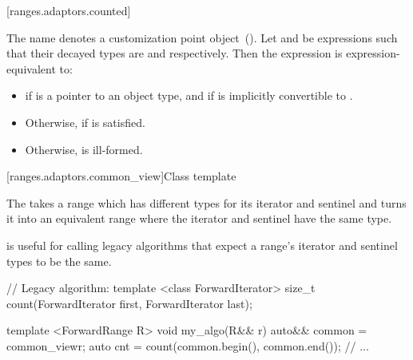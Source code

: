 [ranges.adaptors.counted]{}

\pnum
The name  denotes a customization point object~().
Let  and  be expressions such that their decayed types are 
and  respectively. Then the expression  is
expression-equivalent to:

\begin{itemize}
\item {} if
 is a pointer to an object type, and if  is implicitly
convertible to .
\item Otherwise, 
if  is satisfied.
\item Otherwise,  is ill-formed.
\end{itemize}

[ranges.adaptors.common_view]{Class template }

\pnum
The  takes a range which has different types for its iterator
and sentinel and turns it into an equivalent range where the iterator and sentinel
have the same type.

\pnum
\remark {} is useful for calling legacy algorithms that expect
a range's iterator and sentinel types to be the same.

\pnum
\enterexample
\begin{codeblock}
// Legacy algorithm:
template <class ForwardIterator>
size_t count(ForwardIterator first, ForwardIterator last);

template <ForwardRange R>
void my_algo(R&& r) {
  auto&& common = common_view{r};
  auto cnt = count(common.begin(), common.end());
  // ...
}
\end{codeblock}
\exitexample

